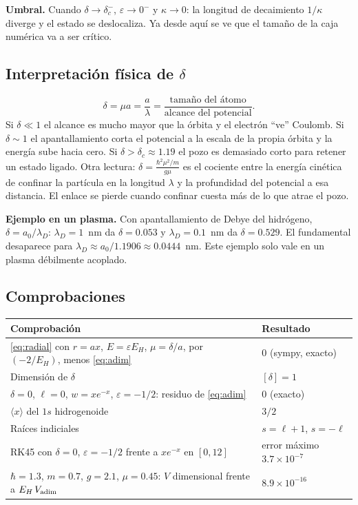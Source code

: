 \documentclass[11pt]{article}
\newcommand{\dc}{\delta_c}
\begin{document}
\textbf{Umbral.} Cuando $\delta\to\dc^-$, $\varepsilon\to0^-$ y $\kappa\to0$: la longitud de decaimiento $1/\kappa$ diverge y el estado se deslocaliza. Ya desde aquí se ve que el tamaño de la caja numérica va a ser crítico.

\subsection{Interpretación física de $\delta$}

\[
\delta=\mu a=\frac{a}{\lambda}=\frac{\text{tamaño del átomo}}{\text{alcance del potencial}}.
\]
Si $\delta\ll1$ el alcance es mucho mayor que la órbita y el electrón ``ve'' Coulomb. Si $\delta\sim1$ el apantallamiento corta el potencial a la escala de la propia órbita y la energía sube hacia cero. Si $\delta>\dc\approx1.19$ el pozo es demasiado corto para retener un estado ligado. Otra lectura: $\delta=\frac{\hbar^2\mu^2/m}{g\mu}$ es el cociente entre la energía cinética de confinar la partícula en la longitud $\lambda$ y la profundidad del potencial a esa distancia. El enlace se pierde cuando confinar cuesta más de lo que atrae el pozo.

\textbf{Ejemplo en un plasma.} Con apantallamiento de Debye del hidrógeno, $\delta=a_0/\lambda_D$: $\lambda_D=1$~nm da $\delta=0.053$ y $\lambda_D=0.1$~nm da $\delta=0.529$. El fundamental desaparece para $\lambda_D\approx a_0/1.1906\approx0.0444$~nm. Este ejemplo solo vale en un plasma débilmente acoplado.

\subsection{Comprobaciones}

\begin{table}[H]
\centering
\small
\begin{tabular}{@{}L{9.5cm}l@{}}
\toprule
\textbf{Comprobación} & \textbf{Resultado}\\
\midrule
\eqref{eq:radial} con $r=ax$, $E=\varepsilon E_H$, $\mu=\delta/a$, por $(-2/E_H)$, menos \eqref{eq:adim} & $0$ (sympy, exacto)\\
Dimensión de $\delta$ & $[\delta]=1$\\
$\delta=0$, $\ell=0$, $w=xe^{-x}$, $\varepsilon=-1/2$: residuo de \eqref{eq:adim} & $0$ (exacto)\\
$\langle x\rangle$ del $1s$ hidrogenoide & $3/2$\\
Raíces indiciales & $s=\ell+1$, $s=-\ell$\\
RK45 con $\delta=0$, $\varepsilon=-1/2$ frente a $xe^{-x}$ en $[0,12]$ & error máximo $3.7\times10^{-7}$\\
$\hbar=1.3$, $m=0.7$, $g=2.1$, $\mu=0.45$: $V$ dimensional frente a $E_H\,V_{\rm adim}$ & $8.9\times10^{-16}$\\
\bottomrule
\end{tabular}
\end{table}
\end{document}
